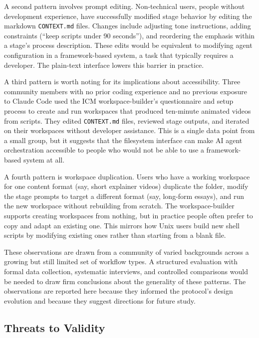 \documentclass[acmlarge,nonacm,screen]{acmart}
\begin{document}
A second pattern involves prompt editing. Non-technical users, people without development experience, have successfully modified stage behavior by editing the markdown \texttt{CONTEXT.md} files. Changes include adjusting tone instructions, adding constraints (``keep scripts under 90 seconds''), and reordering the emphasis within a stage's process description. These edits would be equivalent to modifying agent configuration in a framework-based system, a task that typically requires a developer. The plain-text interface lowers this barrier in practice.

A third pattern is worth noting for its implications about accessibility. Three community members with no prior coding experience and no previous exposure to Claude Code used the ICM workspace-builder's questionnaire and setup process to create and run workspaces that produced ten-minute animated videos from scripts. They edited \texttt{CONTEXT.md} files, reviewed stage outputs, and iterated on their workspaces without developer assistance. This is a single data point from a small group, but it suggests that the filesystem interface can make AI agent orchestration accessible to people who would not be able to use a framework-based system at all.

A fourth pattern is workspace duplication. Users who have a working workspace for one content format (say, short explainer videos) duplicate the folder, modify the stage prompts to target a different format (say, long-form essays), and run the new workspace without rebuilding from scratch. The workspace-builder supports creating workspaces from nothing, but in practice people often prefer to copy and adapt an existing one. This mirrors how Unix users build new shell scripts by modifying existing ones rather than starting from a blank file.

These observations are drawn from a community of varied backgrounds across a growing but still limited set of workflow types. A structured evaluation with formal data collection, systematic interviews, and controlled comparisons would be needed to draw firm conclusions about the generality of these patterns. The observations are reported here because they informed the protocol's design evolution and because they suggest directions for future study.

\subsection{Threats to Validity}
\end{document}
